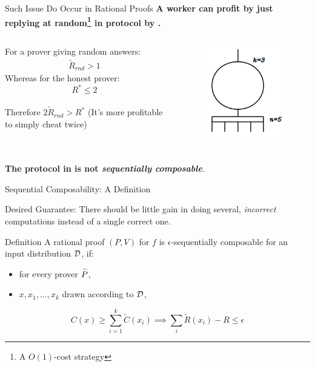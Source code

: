 \begin{frame}[t]{Such Issue Do Occur in Rational Proofs}
\large{\textbf{A worker can profit by just replying at random\footnote{A $O(1)$-cost strategy} in protocol by \cite{am1}.}}
\medskip
\begin{columns}
	For a prover giving random answers:
	\onslide<2->
	\begin{align*}
	\tilde{R}_{rnd} > 1
	\end{align*}
	\onslide<3->
	Whereas for the honest prover:
	\[
	R^* \leq 2
	\]\\
	\medskip
	\onslide<4->
Therefore $2\tilde{R}_{rnd} > R^*$
{(It's more profitable to simply cheat twice)}
	\onslide<1->
	\begin{figure}
		\includegraphics[scale=0.7]{pics/threshold-circ.png}
		
	\end{figure}
\end{columns}
\medskip
	 \textbf{The protocol in \cite{am1} is not \textit{sequentially composable}}.
	\vfill
\end{frame}

\begin{frame}{Sequential Composability: A Definition}

\begin{framed}
\begin{block}{Desired Guarantee:}
	There should be little gain in doing several, \textit{incorrect} computations instead of a single correct one.
\end{block}
\end{framed}
	\bigskip
\pause
	\begin{block}{Definition}
		A rational proof $(P,V)$ for $f$ 
		is $\epsilon$-{\sf sequentially composable} for an input distribution $\cal D$, if:
			\pause
		\begin{itemize}
			\item  for every prover $\widetilde{P}$, 
				\pause
			\item	$x,x_1,\ldots,x_k$ drawn according to ${\cal D}$,
		\end{itemize}
				\pause
		$$C(x) \geq \sum_{i=1}^k 
		\tilde{C}(x_i)\implies \sum_{i}\tilde{R}(x_i) - R \leq \epsilon$$
	\end{block}
\end{frame}

